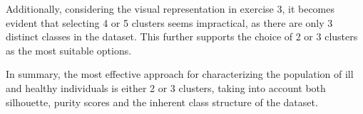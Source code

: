 \documentclass[12pt]{article}
\begin{document}
\begin{enumerate}[leftmargin=\labelsep]
        Additionally, considering the visual representation in exercise 3, it becomes evident that selecting 4 or 5 clusters seems impractical,
        as there are only 3 distinct classes in the dataset. This further supports the choice of 2 or 3 clusters as the most suitable options.

        In summary, the most effective approach for characterizing the population of ill and healthy individuals is either 2 or 3 clusters, taking into
        account both silhouette, purity scores and the inherent class structure of the dataset.
\end{enumerate}
\end{document}
